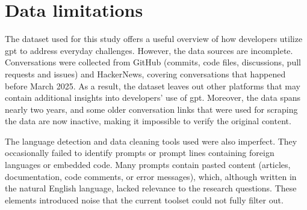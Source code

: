 \section{Data limitations}
The dataset used for this study offers a useful overview of how developers utilize \acrshort{gpt} to address everyday challenges. However, the data sources are incomplete. Conversations were collected from GitHub (commits, code files, discussions, pull requests and issues) and HackerNews, covering conversations that happened before March 2025. As a result, the dataset leaves out other platforms that may contain additional insights into developers' use of \acrshort{gpt}. Moreover, the data spans nearly two years, and some older conversation links that were used for scraping the data are now inactive, making it impossible to verify the original content.

The language detection and data cleaning tools used were also imperfect. They occasionally failed to identify prompts or prompt lines containing foreign languages or embedded code. Many prompts contain pasted content (articles, documentation, code comments, or error messages), which, although written in the natural English language, lacked relevance to the research questions. These elements introduced noise that the current toolset could not fully filter out.